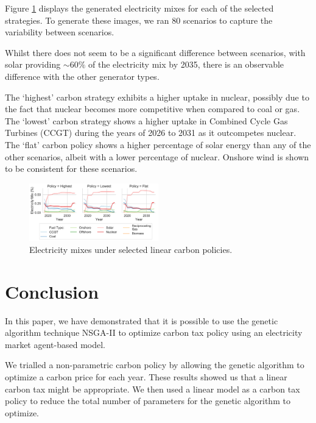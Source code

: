 Figure \ref{fig:best_electricity_mixes_facet} displays the generated electricity mixes for each of the selected strategies. To generate these images, we ran 80 scenarios to capture the variability between scenarios. 

Whilst there does not seem to be a significant difference between scenarios, with solar providing ${\sim}60\%$ of the electricity mix by 2035, there is an observable difference with the other generator types.

The `highest' carbon strategy exhibits a higher uptake in nuclear, possibly due to the fact that nuclear becomes more competitive when compared to coal or gas. The `lowest' carbon strategy shows a higher uptake in Combined Cycle Gas Turbines (CCGT) during the years of 2026 to 2031 as it outcompetes nuclear. The `flat' carbon policy shows a higher percentage of solar energy than any of the other scenarios, albeit with a lower percentage of nuclear. Onshore wind is shown to be consistent for these scenarios.

\begin{figure}
	\centering
	\includegraphics[width=0.50\textwidth]{Chapter6/figures/results/best_electricity_mixes_facet}
	\caption{Electricity mixes under selected linear carbon policies.}
	\label{fig:best_electricity_mixes_facet}
\end{figure}






\section{Conclusion}
\label{sec:conclusion}

In this paper, we have demonstrated that it is possible to use the genetic algorithm technique NSGA-II to optimize carbon tax policy using an electricity market agent-based model. 

We trialled a non-parametric carbon policy by allowing the genetic algorithm to optimize a carbon price for each year. These results showed us that a linear carbon tax might be appropriate. We then used a linear model as a carbon tax policy to reduce the total number of parameters for the genetic algorithm to optimize.  

